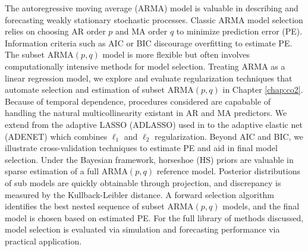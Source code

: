 The autoregressive moving average (ARMA) model is valuable in describing and forecasting weakly stationary stochastic processes. Classic ARMA model selection relies on choosing AR order $p$ and MA order $q$ to minimize prediction error (PE). Information criteria such as AIC or BIC discourage overfitting to estimate PE. The subset ARMA$(p,q)$ model is more flexible but often involves  computationally intensive methods for model selection. Treating ARMA as a linear regression model, we explore and evaluate regularization techniques that automate selection and estimation of subset ARMA$(p,q)$ in Chapter \ref{chap:co2}. Because of temporal dependence, procedures considered are capabable of handling the natural multicollinearity existant in AR and MA predictors. We extend from the adaptive LASSO (ADLASSO) used in \cite{Chen2011} to the adaptive elastic net (ADENET) which combines $\ell_1$ and $\ell_2$ regularization. Beyond AIC and BIC, we illustrate cross-validation techniques to estimate PE and aid in final model selection. Under the Bayesian framework, horseshoe (HS) priors are valuable in sparse estimation of a full ARMA$(p,q)$ reference model. Posterior distributions of sub models are quickly obtainable through projection, and discrepancy is measured by the Kullback-Leibler distance. A forward selection algorithm identifies the best nested sequence of subset ARMA$(p,q)$ models, and the final model is chosen based on estimated PE. For the full library of methods discussed, model selection is evaluated via simulation and forecasting performance via practical application.